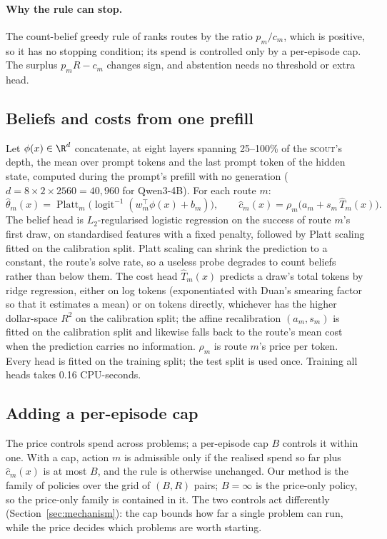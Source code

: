 \documentclass[10pt]{article} %
\newcommand{\scout}{\textsc{scout}\xspace}
\begin{document}
\paragraph{Why the rule can stop.}
The count-belief greedy rule of \citet{chen2026ror} ranks routes by the ratio $p_m/c_m$, which is
positive, so it has no stopping condition; its spend is controlled only by a per-episode cap.
The surplus $p_mR-c_m$ changes sign, and abstention needs no threshold or extra head.

\subsection{Beliefs and costs from one prefill}
\label{sec:probe}

Let $\phi(x)\in\R^{d}$ concatenate, at eight layers spanning 25--100\% of the \scout's depth,
the mean over prompt tokens and the last prompt token of the hidden state, computed during the
prompt's prefill with no generation ($d=8\times2\times2560=40{,}960$ for Qwen3-4B).  For each
route $m$:
\[
\hat\theta_m(x)=\operatorname{Platt}_m\!\bigl(\operatorname{logit}^{-1}(w_m^\top\phi(x)+b_m)\bigr),
\qquad
\hat c_m(x)=\rho_m\bigl(a_m+s_m\,\hat T_m(x)\bigr).
\]
The belief head is $L_2$-regularised logistic regression on the success of route $m$'s first
draw, on standardised features with a fixed penalty, followed by Platt scaling fitted on the
calibration split.  Platt scaling can shrink the prediction to a constant, the route's solve
rate, so a useless probe degrades to count beliefs rather than below them.  The cost head
$\hat T_m(x)$ predicts a draw's total tokens by ridge regression, either on log tokens
(exponentiated with Duan's smearing factor \citep{duan1983smearing} so that it estimates a mean)
or on tokens directly, whichever has the higher dollar-space $R^2$ on the calibration split; the
affine recalibration $(a_m,s_m)$ is fitted on the calibration split and likewise falls back to
the route's mean cost when the prediction carries no information.  $\rho_m$ is route $m$'s price
per token.  Every head is fitted on the training split; the test split is used once.  Training
all heads takes 0.16 CPU-seconds.

\subsection{Adding a per-episode cap}
\label{sec:cap}

The price controls spend across problems; a per-episode cap $B$ controls it within one.  With a
cap, action $m$ is admissible only if the realised spend so far plus $\hat c_m(x)$ is at most $B$,
and the rule is otherwise unchanged.  Our method is the family of policies over the grid of
$(B,R)$ pairs; $B=\infty$ is the price-only policy, so the price-only family is contained in it.
The two controls act differently (Section~\ref{sec:mechanism}): the cap bounds how far a single
problem can run, while the price decides which problems are worth starting.
\end{document}
